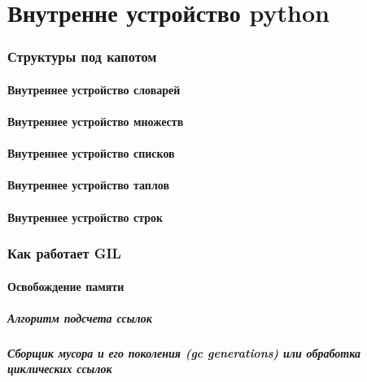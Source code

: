 \part{Внутренне устройство python}

\section{Структуры под капотом}

\subsection{Внутреннее устройство словарей}
\subsection{Внутреннее устройство множеств}
\subsection{Внутреннее устройство списков}
\subsection{Внутреннее устройство таплов}
\subsection{Внутреннее устройство строк}

\section{Как работает GIL}

\subsection{Освобождение памяти}

\subsubsection{Алгоритм подсчета ссылок}
\subsubsection{Сборщик мусора и его поколения (gc generations) или обработка циклических ссылок}
